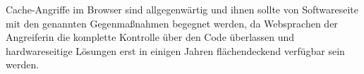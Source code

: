 Cache-Angriffe im Browser sind allgegenwärtig und ihnen sollte von Softwareseite mit den genannten Gegenmaßnahmen begegnet werden, da Websprachen der Angreiferin die komplette Kontrolle über den Code überlassen und hardwareseitige Lösungen erst in einigen Jahren flächendeckend verfügbar sein werden.





